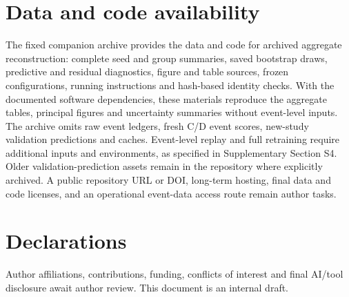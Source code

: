 \documentclass[11pt]{article}
\begin{document}
\section*{Data and code availability}

The fixed companion archive
provides the data and code for archived aggregate reconstruction: complete
seed and group summaries, saved bootstrap draws, predictive and residual
diagnostics, figure and table sources, frozen configurations, running
instructions and hash-based identity checks. With the documented software
dependencies, these materials reproduce the aggregate tables, principal
figures and uncertainty summaries without event-level inputs.
The archive omits raw event ledgers, fresh C/D event scores, new-study
validation predictions and caches. Event-level replay and full retraining
require additional inputs and environments, as specified in Supplementary
Section S4. Older validation-prediction assets remain in the repository where
explicitly archived. A public repository URL or DOI, long-term hosting,
final data and code licenses, and an operational event-data access route
remain author tasks.

\section*{Declarations}
Author affiliations, contributions, funding, conflicts of interest and final
AI/tool disclosure await author review. This document is an internal draft.

\begingroup
\raggedright
\setlength{\bibsep}{3pt}


\endgroup
\end{document}
